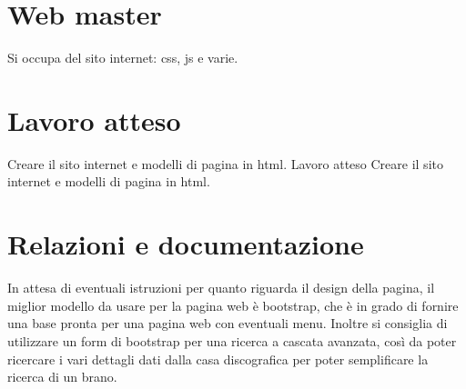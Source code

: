 \section*{Web master}

Si occupa del sito internet\+: css, js e varie. \section*{Lavoro atteso}

Creare il sito internet e modelli di pagina in html. Lavoro atteso Creare il sito internet e modelli di pagina in html. \section*{Relazioni e documentazione}

In attesa di eventuali istruzioni per quanto riguarda il design della pagina, il miglior modello da usare per la pagina web è bootstrap, che è in grado di fornire una base pronta per una pagina web con eventuali menu. Inoltre si consiglia di utilizzare un form di bootstrap per una ricerca a cascata avanzata, così da poter ricercare i vari dettagli dati dalla casa discografica per poter semplificare la ricerca di un brano.  